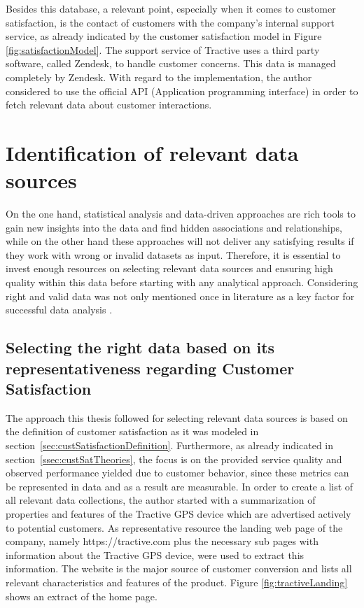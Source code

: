 Besides this database, a relevant point, especially when it comes to customer satisfaction, is the contact of customers with the company's internal support service, as already indicated by the customer satisfaction model in Figure \ref{fig:satisfactionModel}. The support service of Tractive uses a third party software, called Zendesk, to handle customer concerns. This data is managed completely by Zendesk. With regard to the implementation, the author considered to use the official API (Application programming interface) in order to fetch relevant data about customer interactions. 

\section{Identification of relevant data sources}
\label{sec:dataSources}
On the one hand, statistical analysis and data-driven approaches are rich tools to gain new insights into the data and find hidden associations and relationships, while on the other hand these approaches will not deliver any satisfying results if they work with wrong or invalid datasets as input. Therefore, it is essential to invest enough resources on selecting relevant data sources and ensuring high quality within this data before starting with any analytical approach. Considering right and valid data was not only mentioned once in literature as a key factor for successful data analysis \cite{neckel2015}. 

\subsection{Selecting the right data based on its representativeness regarding Customer Satisfaction}
The approach this thesis followed for selecting relevant data sources is based on the definition of customer satisfaction as it was modeled in section~\ref{sec:custSatisfactionDefinition}. Furthermore, as already indicated in section~\ref{ssec:custSatTheories}, the focus is on the provided service quality and observed performance yielded due to customer behavior, since these metrics can be represented in data and as a result are measurable. In order to create a list of all relevant data collections, the author started with a summarization of properties and features of the Tractive GPS device which are advertised actively to potential customers. As representative resource the landing web page of the company, namely https://tractive.com plus the necessary sub pages with information about the Tractive GPS device, were used to extract this information. The website is the major source of customer conversion and lists all relevant characteristics and features of the product. Figure \ref{fig:tractiveLanding} shows an extract of the home page.

